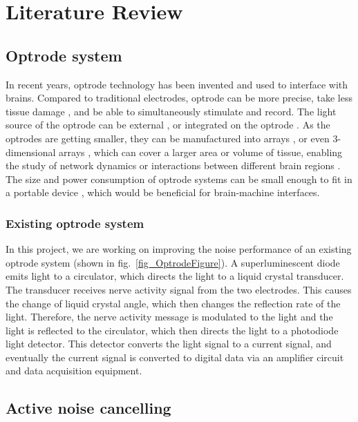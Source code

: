 \chapter{Literature Review}\label{c:literature}

\section{Optrode system}

In recent years, optrode technology has been invented and used to interface with brains.  Compared to traditional electrodes, optrode can be more precise, take less tissue damage \cite{MoreOptrode_5}, and be able to simultaneously stimulate and record.  The light source of the optrode can be external \cite{MoreOptrode_6}\cite{MoreOptrode_7}, or integrated on the optrode \cite{MoreOptrode_8}\cite{MoreOptrode_2}.  As the optrodes are getting smaller, they can be manufactured into arrays \cite{MoreOptrode_1}\cite{MoreOptrode_3}, or even 3-dimensional arrays \cite{MoreOptrode_4}, which can cover a larger area or volume of tissue, enabling the study of network dynamics \cite{MoreOptrode_9} or interactions between different brain regions \cite{MoreOptrode_10}.  The size and power consumption of optrode systems can be small enough to fit in a portable device \cite{MoreOptrode_11}, which would be beneficial for brain-machine interfaces.

\subsection{Existing optrode system}
In this project, we are working on improving the noise performance of an existing optrode system \cite{OptrodeProceesings} (shown in fig.~\ref{fig_OptrodeFigure}).  A superluminescent diode emits light to a circulator, which directs the light to a liquid crystal transducer.  The transducer receives nerve activity signal from the two electrodes.  This causes the change of liquid crystal angle, which then changes the reflection rate of the light.  Therefore, the nerve activity message is modulated to the light and the light is reflected to the circulator, which then directs the light to a photodiode light detector.  This detector converts the light signal to a current signal, and eventually the current signal is converted to digital data via an amplifier circuit and data acquisition equipment. 

\section{Active noise cancelling}

